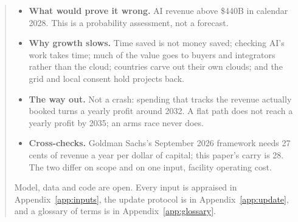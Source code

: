 \documentclass[11pt,letterpaper]{article}
\begin{document}
\begin{abstract}
\begin{itemize}
  On a flat path the money has lost about 4\% a year on average by 2035. If spending keeps rising, about 10\%. And the losses are not free: they are paid for by borrowing (Alphabet's long-term debt rose from \$21.6B to \$125.1B in a year~\cite{ref:yahoo_nasdaq_1029}) or by giving up other earnings, so the hole grows with interest.

  In today's money it is worse: after inflation (about 2.6\% a year, counted once) flat spending is losing about 6.5\% a year on average in 2035, while fixed-price contracts lose value and power and labor costs rise. Tax, too, widens the gap rather than closing it.
\item \textbf{What would prove it wrong.} AI revenue above \$440B in calendar 2028. This is a probability assessment, not a forecast.
\item \textbf{Why growth slows.} Time saved is not money saved; checking AI's work takes time; much of the value goes to buyers and integrators rather than the cloud; countries carve out their own clouds; and the grid and local consent hold projects back.
\item \textbf{The way out.} Not a crash: spending that tracks the revenue actually booked turns a yearly profit around 2032. A flat path does not reach a yearly profit by 2035; an arms race never does.
\item \textbf{Cross-checks.} Goldman Sachs's September 2026 framework needs 27 cents of revenue a year per dollar of capital; this paper's carry is 28. The two differ on scope and on one input, facility operating cost.
\end{itemize}

\noindent\small Model, data and code are open. Every input is appraised in Appendix~\ref{app:inputs}, the update protocol is in Appendix~\ref{app:update}, and a glossary of terms is in Appendix~\ref{app:glossary}.
\end{abstract}
\end{document}
